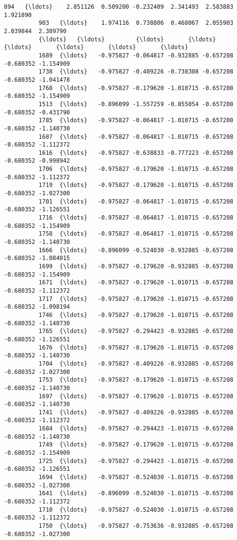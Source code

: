 \documentclass[11pt]{article}
\begin{document}
\begin{Verbatim}[commandchars=\\\{\}]
          894   {\ldots}    2.851126  0.509200 -0.232409  2.341493  2.583883  1.921890   
          903   {\ldots}    1.974116  0.738806  0.468067  2.055903  2.039844  2.389790   
          {\ldots}   {\ldots}         {\ldots}       {\ldots}       {\ldots}       {\ldots}       {\ldots}       {\ldots}   
          1689  {\ldots}   -0.975827 -0.064817 -0.932885 -0.657208 -0.680352 -1.154909   
          1738  {\ldots}   -0.975827 -0.409226 -0.738308 -0.657208 -0.680352 -1.041478   
          1768  {\ldots}   -0.975827 -0.179620 -1.010715 -0.657208 -0.680352 -1.154909   
          1513  {\ldots}   -0.896099 -1.557259 -0.855054 -0.657208 -0.680352 -0.431790   
          1785  {\ldots}   -0.975827 -0.064817 -1.010715 -0.657208 -0.680352 -1.140730   
          1687  {\ldots}   -0.975827 -0.064817 -1.010715 -0.657208 -0.680352 -1.112372   
          1616  {\ldots}   -0.975827 -0.638833 -0.777223 -0.657208 -0.680352 -0.998942   
          1706  {\ldots}   -0.975827 -0.179620 -1.010715 -0.657208 -0.680352 -1.112372   
          1719  {\ldots}   -0.975827 -0.179620 -1.010715 -0.657208 -0.680352 -1.027300   
          1701  {\ldots}   -0.975827 -0.064817 -1.010715 -0.657208 -0.680352 -1.126551   
          1716  {\ldots}   -0.975827 -0.064817 -1.010715 -0.657208 -0.680352 -1.154909   
          1758  {\ldots}   -0.975827 -0.064817 -1.010715 -0.657208 -0.680352 -1.140730   
          1666  {\ldots}   -0.896099 -0.524030 -0.932885 -0.657208 -0.680352 -1.084015   
          1699  {\ldots}   -0.975827 -0.179620 -0.932885 -0.657208 -0.680352 -1.154909   
          1671  {\ldots}   -0.975827 -0.179620 -1.010715 -0.657208 -0.680352 -1.112372   
          1717  {\ldots}   -0.975827 -0.179620 -1.010715 -0.657208 -0.680352 -1.098194   
          1746  {\ldots}   -0.975827 -0.179620 -1.010715 -0.657208 -0.680352 -1.140730   
          1765  {\ldots}   -0.975827 -0.294423 -0.932885 -0.657208 -0.680352 -1.126551   
          1676  {\ldots}   -0.975827 -0.179620 -1.010715 -0.657208 -0.680352 -1.140730   
          1704  {\ldots}   -0.975827 -0.409226 -0.932885 -0.657208 -0.680352 -1.027300   
          1753  {\ldots}   -0.975827 -0.179620 -1.010715 -0.657208 -0.680352 -1.140730   
          1697  {\ldots}   -0.975827 -0.179620 -1.010715 -0.657208 -0.680352 -1.140730   
          1741  {\ldots}   -0.975827 -0.409226 -0.932885 -0.657208 -0.680352 -1.112372   
          1684  {\ldots}   -0.975827 -0.294423 -1.010715 -0.657208 -0.680352 -1.140730   
          1749  {\ldots}   -0.975827 -0.179620 -1.010715 -0.657208 -0.680352 -1.154909   
          1725  {\ldots}   -0.975827 -0.294423 -1.010715 -0.657208 -0.680352 -1.126551   
          1694  {\ldots}   -0.975827 -0.524030 -1.010715 -0.657208 -0.680352 -1.027300   
          1641  {\ldots}   -0.896099 -0.524030 -1.010715 -0.657208 -0.680352 -1.112372   
          1710  {\ldots}   -0.975827 -0.524030 -1.010715 -0.657208 -0.680352 -1.112372   
          1750  {\ldots}   -0.975827 -0.753636 -0.932885 -0.657208 -0.680352 -1.027300   
          

\end{Verbatim}
\end{document}
